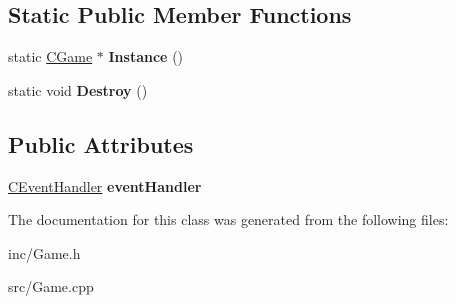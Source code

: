 \subsection*{Static Public Member Functions}
\begin{DoxyCompactItemize}
\item 
\hypertarget{classCGame_a324bb18369f06a07c27104493498456c}{static \hyperlink{classCGame}{C\-Game} $\ast$ {\bfseries Instance} ()}\label{classCGame_a324bb18369f06a07c27104493498456c}

\item 
\hypertarget{classCGame_a7afb5e6c3e77d33b564f971b3c9779f2}{static void {\bfseries Destroy} ()}\label{classCGame_a7afb5e6c3e77d33b564f971b3c9779f2}

\end{DoxyCompactItemize}
\subsection*{Public Attributes}
\begin{DoxyCompactItemize}
\item 
\hypertarget{classCGame_a83518f35939650ed60104d41db622379}{\hyperlink{classCEventHandler}{C\-Event\-Handler} {\bfseries event\-Handler}}\label{classCGame_a83518f35939650ed60104d41db622379}

\end{DoxyCompactItemize}


The documentation for this class was generated from the following files\-:\begin{DoxyCompactItemize}
\item 
inc/Game.\-h\item 
src/Game.\-cpp\end{DoxyCompactItemize}
